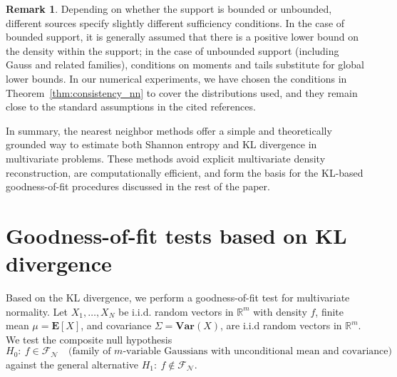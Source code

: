 \documentclass[12pt,a4paper]{article}
\newcommand{\R}{\mathbb R}
\newcommand{\E}{\mathbf {E}}
\newcommand{\Var}{\mathbf{Var}}
\theoremstyle{definition}
\newtheorem{remark}[definition]{Remark}
\theoremstyle{plain}
\begin{document}
{\begin{remark}
Depending on whether the support is bounded or unbounded, different sources specify slightly different sufficiency conditions. In the case of bounded support, it is generally assumed that there is a positive lower bound on the density within the support; in the case of unbounded
support (including Gauss and related families), conditions on moments and tails substitute for global lower bounds. In our numerical experiments, we have chosen the conditions in Theorem~\ref{thm:consistency_nn} to cover the distributions used, and they remain close to the standard assumptions in the cited references.
\end{remark}
In summary, the nearest neighbor methods offer a simple and theoretically grounded way to estimate both Shannon entropy and KL divergence in multivariate problems.
These methods avoid explicit multivariate density reconstruction,
are computationally efficient, and form the basis for the KL-based goodness-of-fit procedures
discussed in the rest of the paper.

\section{Goodness-of-fit tests based on KL divergence}
\label{sec:hypothesis_test_KL}

Based on the  KL divergence, we perform a goodness-of-fit test for multivariate normality. Let {${X}_1,\dots,{X}_N$} be i.i.d. random vectors in $\R^m$ with density $f$, finite mean ${\mu} = \E[{{X}}]$, and covariance
${\Sigma} = \Var({{X}})$, are i.i.d random vectors in $\R^m$. We test the composite null hypothesis
\[
H_0:\ f \in \mathcal{F}_{\mathcal N}
\quad\text{(family of $m$-variable Gaussians with unconditional mean and covariance)}
\]
against the general alternative $H_1:\ f\notin \mathcal{F}_{\mathcal N}$.

}
\end{document}
